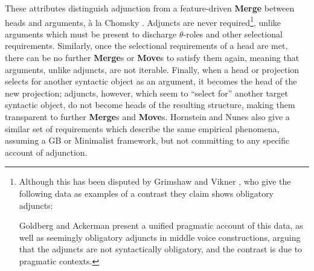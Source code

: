 \documentclass{article}
\begin{document}
\begin{exe}
\end{exe}

These attributes distinguish adjunction from a feature-driven
\textbf{Merge} between heads and arguments, à la Chomsky
\cite{chomsky1995}.  Adjuncts are never required\footnote{Although
  this has been disputed by Grimshaw and Vikner \cite{grimshaw1993},
  who give the following data as examples of a contrast they claim
  shows obligatory adjuncts:

  \begin{exe}
    \ex
    \begin{xlist}
    \end{xlist}
    \ex
    \begin{xlist}
    \end{xlist}
  \end{exe}

  Goldberg and Ackerman \cite{goldberg2001} present a unified
  pragmatic account of this data, as well as seemingly obligatory
  adjuncts in middle voice constructions, arguing that the adjuncts
  are not syntactically obligatory, and the contrast is due to
  pragmatic contexts.}, unlike arguments which must be present to
discharge $\theta$-roles and other selectional requirements.
Similarly, once the selectional requirements of a head are met, there
can be no further \textbf{Merge}s or \textbf{Move}s to satisfy them
again, meaning that arguments, unlike adjuncts, are not iterable.
Finally, when a head or projection selects for another syntactic
object as an argument, it becomes the head of the new projection;
adjuncts, however, which seem to ``select for'' another target
syntactic object, do not become heads of the resulting structure,
making them transparent to further \textbf{Merge}s and \textbf{Move}s.
Hornstein and Nunes \cite{hornstein2008a} also give a similar set of
requirements which describe the same empirical phenomena, assuming a
GB or Minimalist framework, but not committing to any specific account
of adjunction.%
\end{document}
